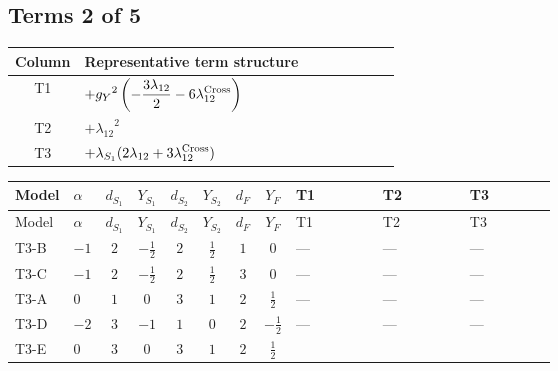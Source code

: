 \documentclass[8pt]{article}
\begin{document}
\begin{landscape}
\subsection*{Terms 2 of 5}
\begin{center}
\begin{tabular}{@{}c >{\raggedright\arraybackslash}p{0.82\linewidth}@{}}
\toprule
Column & Representative term structure \\
\midrule
T1 & \(\displaystyle +{g_Y}^2 \left(-\frac{3 {\lambda_{12}}}{2}-6 {\lambda_{12}^{\rm Cross}}\right)\) \\
\midrule
T2 & \(\displaystyle +{\lambda_{12}}^2\) \\
\midrule
T3 & \(\displaystyle +{\lambda_{S_1}} (2 {\lambda_{12}}+3 {\lambda_{12}^{\rm Cross}})\) \\
\midrule
\bottomrule
\end{tabular}
\end{center}
\smallskip
\tiny
\begin{longtable}{@{}llcccccc >{\raggedright\arraybackslash}p{0.21\linewidth} >{\raggedright\arraybackslash}p{0.21\linewidth} >{\raggedright\arraybackslash}p{0.21\linewidth}@{}}
\toprule
Model & $\alpha$ & $d_{S_1}$ & $Y_{S_1}$ & $d_{S_2}$ & $Y_{S_2}$ & $d_F$ & $Y_F$ & T1 & T2 & T3 \\
\midrule
\endfirsthead
\toprule
Model & $\alpha$ & $d_{S_1}$ & $Y_{S_1}$ & $d_{S_2}$ & $Y_{S_2}$ & $d_F$ & $Y_F$ & T1 & T2 & T3 \\
\midrule
\endhead
T3-B & $-1$ & $2$ & $-\frac{1}{2}$ & $2$ & $\frac{1}{2}$ & $1$ & $0$ & --- & --- & --- \\
\midrule
T3-C & $-1$ & $2$ & $-\frac{1}{2}$ & $2$ & $\frac{1}{2}$ & $3$ & $0$ & --- & --- & --- \\
\midrule
T3-A & $0$ & $1$ & $0$ & $3$ & $1$ & $2$ & $\frac{1}{2}$ & --- & --- & --- \\
\midrule
T3-D & $-2$ & $3$ & $-1$ & $1$ & $0$ & $2$ & $-\frac{1}{2}$ & --- & --- & --- \\
\midrule
T3-E & $0$ & $3$ & $0$ & $3$ & $1$ & $2$ & $\frac{1}{2}$ & \scriptsize\adjustbox{max width=\linewidth}{$\begin{gathered} +{g_Y}^2 \left(-\frac{3 {\lambda_{12}}}{2}-6 {\lambda_{12}^{\rm Cross}}\right)\end{gathered}$} & \scriptsize\adjustbox{max width=\linewidth}{$\begin{gathered} +{\lambda_{12}}^2\end{gathered}$} & \scriptsize\adjustbox{max width=\linewidth}{$\begin{gathered} +{\lambda_{S_1}} (2 {\lambda_{12}}+3 {\lambda_{12}^{\rm Cross}})\end{gathered}$} \\
\midrule
\bottomrule
\end{longtable}
\clearpage

\end{landscape}
\end{document}
